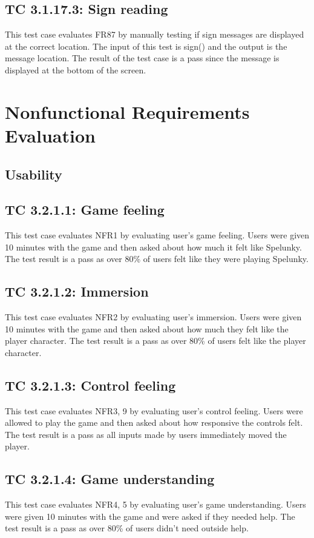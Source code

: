 \documentclass[12pt, titlepage]{article}
\begin{document}
\subsection*{TC 3.1.17.3: Sign reading}

This test case evaluates FR87 by manually testing if sign messages are displayed at the correct location. The input of this test is sign() and the output is the message location. The result of the test case is a pass since the message is displayed at the bottom of the screen.

\section{Nonfunctional Requirements Evaluation}

\subsection{Usability}

\subsection*{TC 3.2.1.1: Game feeling}
This test case evaluates NFR1 by evaluating user's game feeling. Users were given 10 minutes with the game and then asked about how much it felt like Spelunky. The test result is a pass as over 80\% of users felt like they were playing Spelunky.

\subsection*{TC 3.2.1.2: Immersion}
This test case evaluates NFR2 by evaluating user's immersion. Users were given 10 minutes with the game and then asked about how much they felt like the player character. The test result is a pass as over 80\% of users felt like the player character.

\subsection*{TC 3.2.1.3: Control feeling}
This test case evaluates NFR3, 9 by evaluating user's control feeling. Users were allowed to play the game and then asked about how responsive the controls felt. The test result is a pass as all inputs made by users immediately moved the player.

\subsection*{TC 3.2.1.4: Game understanding}
This test case evaluates NFR4, 5 by evaluating user's game understanding. Users were given 10 minutes with the game and were asked if they needed help. The test result is a pass as over 80\% of users didn't need outside help.
\end{document}
